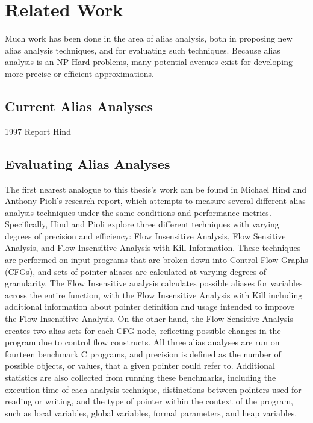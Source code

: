 \chapter{Related Work}

Much work has been done in the area of alias analysis, both in proposing new alias analysis techniques, and for evaluating such techniques. Because alias analysis is an NP-Hard problems, many potential avenues exist for developing more precise or efficient approximations.

\section{Current Alias Analyses}

1997 Report Hind

\section{Evaluating Alias Analyses}
The first nearest analogue to this thesis's work can be found in Michael Hind and Anthony Pioli's research report, which attempts to measure several different alias analysis techniques under the same conditions and performance metrics. Specifically, Hind and Pioli explore three different techniques with varying degrees of precision and efficiency: Flow Insensitive Analysis, Flow Sensitive Analysis, and Flow Insensitive Analysis with Kill Information. These techniques are performed on input programs that are broken down into Control Flow Graphs (CFGs), and sets of pointer aliases are calculated at varying degrees of granularity. The Flow Insensitive analysis calculates possible aliases for variables across the entire function, with the Flow Insensitive Analysis with Kill including additional information about pointer definition and usage intended to improve the Flow Insensitive Analysis. On the other hand, the Flow Sensitive Analysis creates two alias sets for each CFG node, reflecting possible changes in the program due to control flow constructs. All three alias analyses are run on fourteen benchmark C programs, and precision is defined as the number of possible objects, or values, that a given pointer could refer to. Additional statistics are also collected from running these benchmarks, including the execution time of each analysis technique, distinctions between pointers used for reading or writing, and the type of pointer within the context of the program, such as local variables, global variables, formal parameters, and heap variables.

